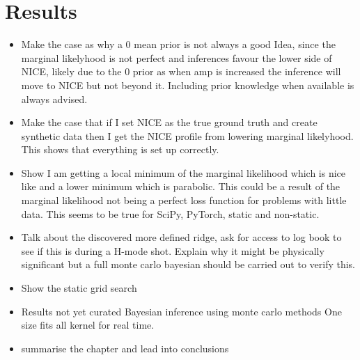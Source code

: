 \chapter{Results}

\begin{itemize}
    \item Make the case as why a 0 mean prior is not always a good Idea, since the marginal likelyhood is not perfect and inferences favour the lower side of NICE, likely due to the 0 prior as when amp is increased the inference will move to NICE but not beyond it. Including prior knowledge when available is always advised.
    
    \item Make the case that if I set NICE as the true ground truth and create synthetic data then I get the NICE profile from lowering marginal likelyhood. This shows that everything is set up correctly.
    
    \item Show I am getting a local minimum of the marginal likelihood which is nice like and a lower minimum which is parabolic. This could be a result of the marginal likelihood not being a perfect loss function for problems with little data. This seems to be true for SciPy, PyTorch, static and non-static.
    \item Talk about the discovered more defined ridge, ask for access to log book to see if this is during a H-mode shot. Explain why it might be physically significant but a full monte carlo bayesian should be carried out to verify this. 
    \item Show the static grid search

    \item Results not yet curated
        \subitem Bayesian inference using monte carlo methods
        \subitem One size fits all kernel for real time. 
    \item summarise the chapter and lead into conclusions
\end{itemize}
